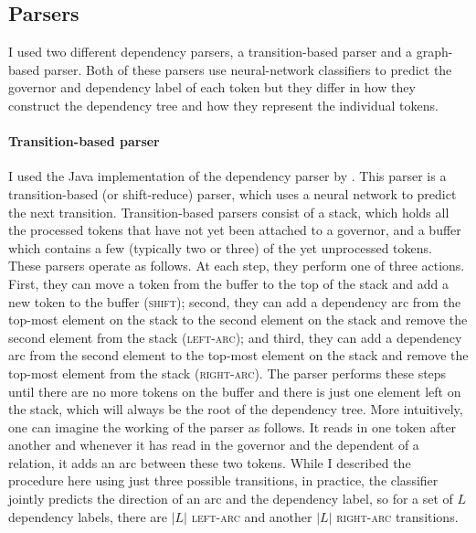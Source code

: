 \documentclass[lucida,biblatex]{sp} %
\begin{document}
\subsection{Parsers}

I used two different dependency parsers, a transition-based parser and a graph-based parser. Both of these parsers use neural-network classifiers to predict the governor and dependency label of each token but they differ in how they construct the dependency tree and how they represent the individual tokens.

\paragraph{Transition-based parser}

I used the Java implementation of the dependency parser by \textcite{Chen2014}. This parser is a transition-based (or shift-reduce) parser, which uses a neural network to predict the next transition. Transition-based parsers consist of a stack, which holds all the processed tokens that have not yet been attached to a governor, and a buffer which contains a few (typically two or three) of the yet unprocessed tokens. These parsers operate as follows. At each step, they perform one of three actions. First, they can move a token from the buffer to the top of the stack and add a new token to the buffer (\textsc{shift}); second, they can add a dependency arc from the top-most element on the stack to the second element on the stack and remove the second element from the stack (\textsc{left-arc}); and third, they can add a dependency arc from the second element to the top-most element on the stack and remove the top-most element from the stack (\textsc{right-arc}). The parser performs these steps until there are no more tokens on the buffer and there is just one element left on the stack, which will always be the root of the dependency tree. More intuitively, one can imagine the working of the parser as follows. It reads in one token after another and whenever it has read in the governor and the dependent of a relation, it adds an arc between these two tokens. While I described the procedure here using just three possible transitions, in practice, the classifier jointly predicts the direction of an arc and the dependency label, so for a set of $L$ dependency labels, there are $|L|$ \textsc{left-arc} and another $|L|$ \textsc{right-arc} transitions.
\end{document}
